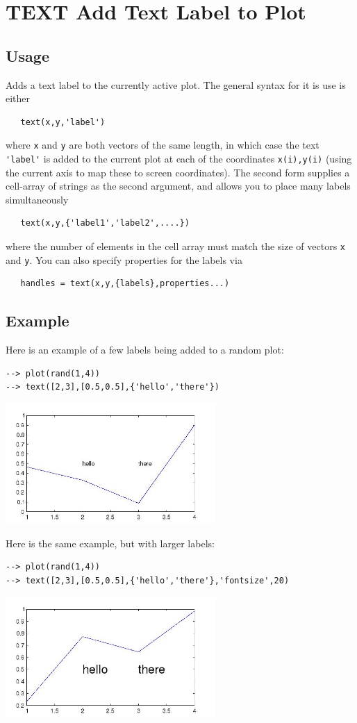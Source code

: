 \section{TEXT Add Text Label to Plot}

\subsection{Usage}

Adds a text label to the currently active plot.  The general
syntax for it is use is either
\begin{verbatim}
   text(x,y,'label')
\end{verbatim}
where \verb|x| and \verb|y| are both vectors of the same length, in which
case the text \verb|'label'| is added to the current plot at each of the
coordinates \verb|x(i),y(i)| (using the current axis to map these to screen
coordinates).  The second form supplies a cell-array of strings
as the second argument, and allows you to place many labels simultaneously
\begin{verbatim}
   text(x,y,{'label1','label2',....})
\end{verbatim}
where the number of elements in the cell array must match the size of
vectors \verb|x| and \verb|y|.  You can also specify properties for the labels
via
\begin{verbatim}
   handles = text(x,y,{labels},properties...)
\end{verbatim}
\subsection{Example}

Here is an example of a few labels being added to a random plot:
\begin{verbatim}
--> plot(rand(1,4))
--> text([2,3],[0.5,0.5],{'hello','there'})
\end{verbatim}


\centerline{\includegraphics[width=8cm]{text1}}

Here is the same example, but with larger labels:
\begin{verbatim}
--> plot(rand(1,4))
--> text([2,3],[0.5,0.5],{'hello','there'},'fontsize',20)
\end{verbatim}


\centerline{\includegraphics[width=8cm]{text2}}

